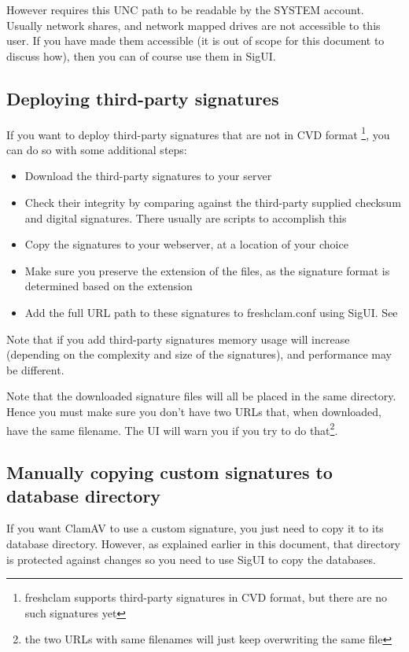 However \CW requires this \gls{UNC path} to be readable by the \gls{SYSTEM account}.
Usually network shares, and network mapped drives are not accessible to this user.
If you have made them accessible (it is out of scope for this document to discuss how), then you can of course use them in SigUI.

\subsection{Deploying third-party signatures}

If you want to deploy third-party signatures that are not in \gls{CVD} format \footnote{freshclam supports third-party signatures in CVD format, but there are no such signatures yet}, you can do so with some additional steps:
\begin{itemize}
\item Download the third-party signatures to your server
\item Check their integrity by comparing against the third-party supplied checksum and digital signatures. There usually are scripts to accomplish this
\item Copy the signatures to your webserver, at a location of your choice
\item Make sure you preserve the extension of the files, as the signature format is determined based on the extension
\item Add the full URL path to these signatures to \gls{freshclam.conf} using \gls{SigUI}.
See 
\end{itemize}

Note that if you add third-party signatures memory usage will increase (depending on the complexity and size of the signatures), and performance may be different.

Note that the downloaded signature files will all be placed in the same directory. Hence you must make sure you don't have two URLs that, when downloaded, have the same filename.
The UI will warn you if you try to do that\footnote{the two URLs with same filenames will just keep overwriting the same file}.

\subsection{Manually copying custom signatures to database directory}
\label{sec:custommanual}
If you want \gls{ClamAV} to use a custom signature, you just need to copy it to its database directory. However, as explained earlier in this document, that directory is protected against changes so you need to use SigUI to copy the databases.

